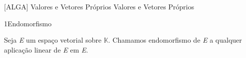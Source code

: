\documentclass[\mainfilename]{subfiles}
\begin{document}
[ALGA]
{Valores e Vetores Próprios}
{Valores e Vetores Próprios}

\begin{sectionBox}1{Endomorfismo}
    
    Seja \textit{E} um espaço vetorial sobre \(\mathbb{K}\). Chamamos endomorfismo de \textit{E} a qualquer aplicação linear de \textit{E} em \textit{E}.
    

\end{sectionBox}
\end{document}
